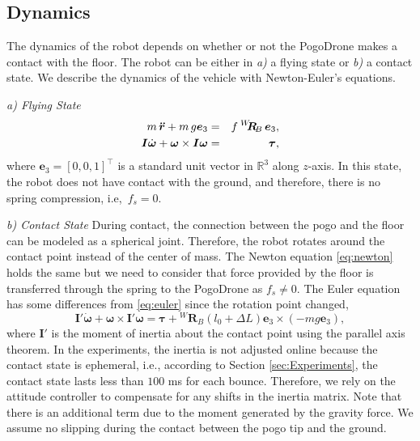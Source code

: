 \documentclass[letterpaper,10pt,conference]{ieeeconf}
\begin{document}
\subsection{Dynamics}
\noindent
The dynamics of the robot depends on whether or not the PogoDrone makes a contact with the floor. The robot can be either in \textit{a)} a flying state or \textit{b)} a contact state.
We describe the dynamics of the vehicle with Newton-Euler's equations.

\textit{a) Flying State}
\begin{eqnarray}
    m\,\boldsymbol{\Ddot{r}}+m\,g\boldsymbol{  e}_3 &=& {f}\: {}^W\!\!\boldsymbol{R}\!_B\,\boldsymbol e_3\label{eq:newton},\\
    \boldsymbol{I}\Dot{\boldsymbol\omega}+\boldsymbol\omega\times \boldsymbol{I}\boldsymbol\omega &=& \boldsymbol\tau\label{eq:euler},
\label{eq:dynamics}
\end{eqnarray}
where $\boldsymbol{e}_3 = [0, 0, 1]^\top$ is a standard unit vector in $\mathbb{R}^3$ along $z$-axis. In this state, the robot does not have contact with the ground, and therefore, there is no spring compression, i.e,~$f_s = 0$.

\textit{b) Contact State}
During contact, the connection between the pogo and the floor can be modeled as a spherical joint. Therefore, the robot rotates around the contact point instead of the center of mass. The Newton equation \eqref{eq:newton} holds the same but we need to consider that force provided by the floor is transferred through the spring to the PogoDrone as $f_s\neq 0$. 
The Euler equation has some differences from \eqref{eq:euler} since the rotation point changed,
\begin{equation}
    \boldsymbol{I'\Dot\omega}+\boldsymbol\omega\times \boldsymbol{I'}\boldsymbol\omega = \boldsymbol\tau + {}^W\!\!\boldsymbol{R}_B(l_0+\Delta L)\boldsymbol{e}_3\times(-mg\boldsymbol{e}_3),
    \label{eq:neweuler}
\end{equation}
where $\boldsymbol{I'}$ is the moment of inertia about the contact point using the parallel axis theorem. In the experiments, the inertia is not adjusted online because the contact state is ephemeral, i.e., according to Section \ref{sec:Experiments}, the contact state lasts less than $100$ ms for each bounce. Therefore, we rely on the attitude controller to compensate for any shifts in the inertia matrix.
Note that there is an additional term due to the moment generated by the gravity force. 
We assume no slipping during the contact between the pogo tip and the ground.
\end{document}
